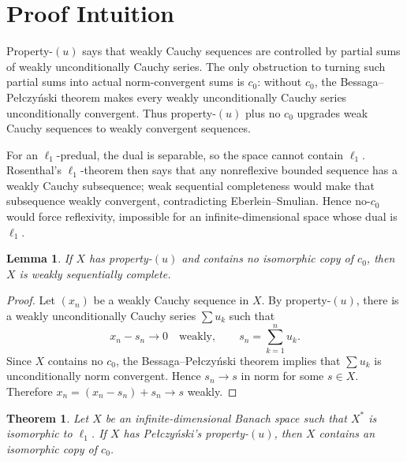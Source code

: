 \documentclass[11pt]{article}
\newtheorem{theorem}{Theorem}
\newtheorem{lemma}{Lemma}
\newcommand{\ellone}{\ell_1}
\newcommand{\czero}{c_0}
\newcommand{\wuc}{weakly unconditionally Cauchy}
\begin{document}
\section*{Proof Intuition}

Property-\((u)\) says that weakly Cauchy sequences are controlled by partial
sums of \wuc{} series.  The only obstruction to turning such partial sums into
actual norm-convergent sums is \(\czero\): without \(\czero\), the
Bessaga--Pe\l czy\'nski theorem makes every \wuc{} series unconditionally
convergent.  Thus property-\((u)\) plus no \(\czero\) upgrades weak Cauchy
sequences to weakly convergent sequences.

For an \(\ellone\)-predual, the dual is separable, so the space cannot contain
\(\ellone\).  Rosenthal's \(\ellone\)-theorem then says that any nonreflexive
bounded sequence has a weakly Cauchy subsequence; weak sequential completeness
would make that subsequence weakly convergent, contradicting
Eberlein--Smulian.  Hence no-\(\czero\) would force reflexivity, impossible
for an infinite-dimensional space whose dual is \(\ellone\).

\begin{lemma}\label{lem:u-no-c0-wsc}
If \(X\) has property-\((u)\) and contains no isomorphic copy of \(\czero\),
then \(X\) is weakly sequentially complete.
\end{lemma}

\begin{proof}
Let \((x_n)\) be a weakly Cauchy sequence in \(X\).  By property-\((u)\), there
is a \wuc{} series \(\sum u_k\) such that
\[
  x_n-s_n \to 0 \quad\text{weakly}, \qquad
  s_n=\sum_{k=1}^n u_k .
\]
Since \(X\) contains no \(\czero\), the Bessaga--Pe\l czy\'nski theorem implies
that \(\sum u_k\) is unconditionally norm convergent.  Hence \(s_n\to s\) in
norm for some \(s\in X\).  Therefore \(x_n=(x_n-s_n)+s_n\to s\) weakly.
\end{proof}

\begin{theorem}\label{thm:main}
Let \(X\) be an infinite-dimensional Banach space such that \(X^*\) is
isomorphic to \(\ellone\).  If \(X\) has Pe\l czy\'nski's property-\((u)\),
then \(X\) contains an isomorphic copy of \(\czero\).
\end{theorem}
\end{document}
